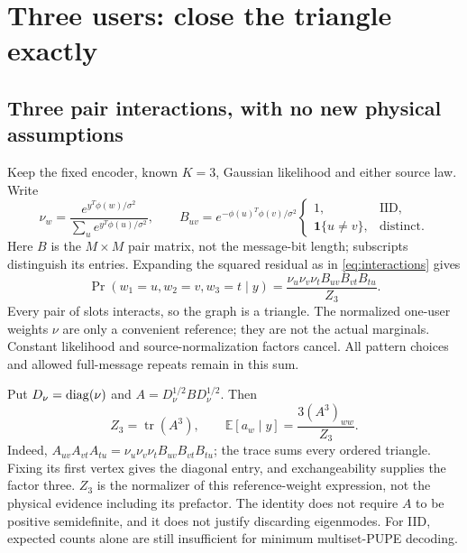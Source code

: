 \documentclass[10pt,a4paper]{article}
\newcommand{\E}{\mathbb E}
\newcommand{\ind}{\mathbf 1}
\newcommand{\tr}{\operatorname{tr}}
\begin{document}
\clearpage
\section{Three users: close the triangle exactly}
\label{sec:three-user}
\subsection{Three pair interactions, with no new physical assumptions}
Keep the fixed encoder, known $K=3$, Gaussian likelihood and either source law. Write
\[
 \nu_w=\frac{e^{y^T\phi(w)/\sigma^2}}{\sum_u e^{y^T\phi(u)/\sigma^2}},\qquad
 B_{uv}=e^{-\phi(u)^T\phi(v)/\sigma^2}
 \begin{cases}1,&\text{IID},\\ \ind\{u\ne v\},&\text{distinct}.\end{cases}
\]
Here $B$ is the $M\times M$ pair matrix, not the message-bit length; subscripts distinguish its entries.
Expanding the squared residual as in \eqref{eq:interactions} gives
\begin{equation}
 \Pr(w_1=u,w_2=v,w_3=t\mid y)
 =\frac{\nu_u\nu_v\nu_t B_{uv}B_{vt}B_{tu}}{Z_3}.
 \label{eq:triangle-posterior}
\end{equation}
Every pair of slots interacts, so the graph is a triangle. The normalized one-user weights $\nu$ are only a
convenient reference; they are not the actual marginals. Constant likelihood and source-normalization factors
cancel. All pattern choices and allowed full-message repeats remain in this sum.

Put $D_\nu=\operatorname{diag}(\nu)$ and $A=D_\nu^{1/2}BD_\nu^{1/2}$. Then
\begin{equation}
 \boxed{Z_3=\tr(A^3),\qquad \E[a_w\mid y]=\frac{3(A^3)_{ww}}{Z_3}.}
 \label{eq:triangle-trace}
\end{equation}
Indeed, $A_{uv}A_{vt}A_{tu}=\nu_u\nu_v\nu_t B_{uv}B_{vt}B_{tu}$; the trace sums every ordered triangle.
Fixing its first vertex gives the diagonal entry, and exchangeability supplies the factor three.
$Z_3$ is the normalizer of this reference-weight expression, not the physical evidence including its prefactor.
The identity does not require $A$ to be positive semidefinite, and it does not justify discarding eigenmodes.
For IID, expected counts alone are still insufficient for minimum multiset-PUPE decoding.
\end{document}
